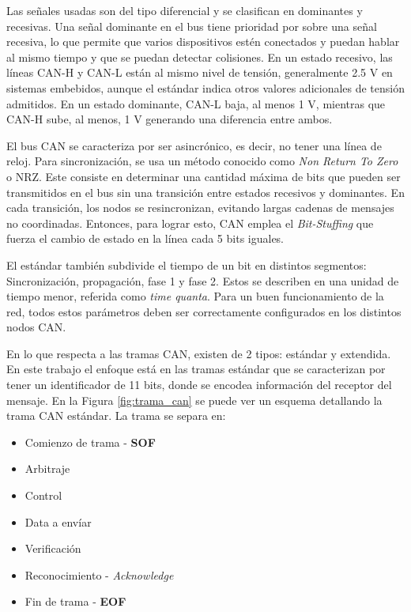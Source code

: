 
Las señales usadas son del tipo diferencial y se clasifican en dominantes y recesivas. Una señal dominante en el bus tiene prioridad por sobre una señal recesiva, lo que permite que varios dispositivos estén conectados y puedan hablar al mismo tiempo y que se puedan detectar colisiones\citep{Embedded_Networking_CAN}. En un estado recesivo, las líneas CAN-H y CAN-L están al mismo nivel de tensión, generalmente 2.5 V en sistemas embebidos, aunque el estándar indica otros valores adicionales de tensión admitidos. En un estado dominante, CAN-L baja, al menos 1 V, mientras que CAN-H sube, al menos, 1 V generando una diferencia entre ambos. 

El bus CAN se caracteriza por ser asincrónico, es decir, no tener una línea de reloj. Para sincronización, se usa un método conocido como \textit{Non Return To Zero} o NRZ. Este consiste en determinar una cantidad máxima de bits que pueden ser transmitidos en el bus sin una transición entre estados recesivos y dominantes. En cada transición, los nodos se resincronizan, evitando largas cadenas de mensajes no coordinadas. Entonces, para lograr esto, CAN emplea el \textit{Bit-Stuffing} que fuerza el cambio de estado en la línea cada 5 bits iguales. 

El estándar también subdivide el tiempo de un bit en distintos segmentos: Sincronización, propagación, fase 1 y fase 2. Estos se describen en una unidad de tiempo menor, referida como \textit{time quanta}. Para un buen funcionamiento de la red, todos estos parámetros deben ser correctamente configurados en los distintos nodos CAN.

En lo que respecta a las tramas CAN, existen de 2 tipos: estándar y extendida. En este trabajo el enfoque está en las tramas estándar que se caracterizan por tener un identificador de 11 bits, donde se encodea información del receptor del mensaje. En la Figura \ref{fig:trama_can} se puede ver un esquema detallando la trama CAN estándar. La trama se separa en:
\begin{itemize}
	\item Comienzo de trama - \textbf{SOF}
	\item Arbitraje
	\item Control
	\item Data a envíar
	\item Verificación
	\item Reconocimiento - \textit{Acknowledge}
	\item Fin de trama - \textbf{EOF}
\end{itemize} 

